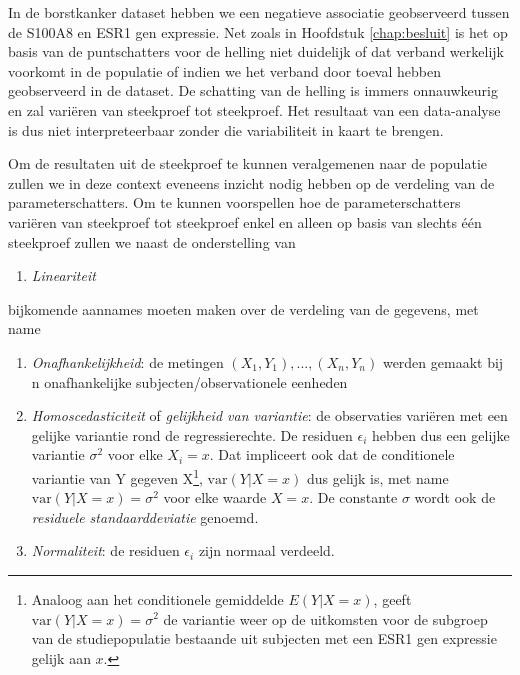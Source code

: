 \documentclass[12pt,dutch,coursenotes]{book}
\providecommand{\tightlist}{%
  \setlength{\itemsep}{0pt}\setlength{\parskip}{0pt}}
\let\rmarkdownfootnote\footnote%
\def\footnote{\protect\rmarkdownfootnote}
\theoremstyle{definition}
\theoremstyle{definition}
\theoremstyle{definition}
\theoremstyle{remark}
\begin{document}
In de borstkanker dataset hebben we een negatieve associatie
geobserveerd tussen de S100A8 en ESR1 gen expressie. Net zoals in
Hoofdstuk \ref{chap:besluit} is het op basis van de puntschatters voor
de helling niet duidelijk of dat verband werkelijk voorkomt in de
populatie of indien we het verband door toeval hebben geobserveerd in de
dataset. De schatting van de helling is immers onnauwkeurig en zal
variëren van steekproef tot steekproef. Het resultaat van een
data-analyse is dus niet interpreteerbaar zonder die variabiliteit in
kaart te brengen.

Om de resultaten uit de steekproef te kunnen veralgemenen naar de
populatie zullen we in deze context eveneens inzicht nodig hebben op de
verdeling van de parameterschatters. Om te kunnen voorspellen hoe de
parameterschatters variëren van steekproef tot steekproef enkel en
alleen op basis van slechts één steekproef zullen we naast de
onderstelling van

\begin{enumerate}
\def\labelenumi{\arabic{enumi}.}
\tightlist
\item
  \emph{Lineariteit}
\end{enumerate}

bijkomende aannames moeten maken over de verdeling van de gegevens, met
name

\begin{enumerate}
\def\labelenumi{\arabic{enumi}.}
\setcounter{enumi}{1}
\tightlist
\item
  \emph{Onafhankelijkheid}: de metingen \((X_1,Y_1), ..., (X_n,Y_n)\)
  werden gemaakt bij n onafhankelijke subjecten/observationele eenheden
\item
  \emph{Homoscedasticiteit} of \emph{gelijkheid van variantie}: de
  observaties variëren met een gelijke variantie rond de
  regressierechte. De residuen \(\epsilon_i\) hebben dus een gelijke
  variantie \(\sigma^2\) voor elke \(X_i=x\). Dat impliceert ook dat de
  conditionele variantie van Y gegeven X\footnote{Analoog aan het
    conditionele gemiddelde \(E(Y|X=x)\), geeft
    \(\text{var}(Y\vert X=x) = \sigma^2\) de variantie weer op de
    uitkomsten voor de subgroep van de studiepopulatie bestaande uit
    subjecten met een ESR1 gen expressie gelijk aan \(x\).},
  \(\text{var}(Y\vert X=x)\) dus gelijk is, met name
  \(\text{var}(Y\vert X=x) = \sigma^2\) voor elke waarde \(X=x\). De
  constante \(\sigma\) wordt ook de \emph{residuele standaarddeviatie}
  genoemd.
\item
  \emph{Normaliteit}: de residuen \(\epsilon_i\) zijn normaal verdeeld.
\end{enumerate}
\end{document}
